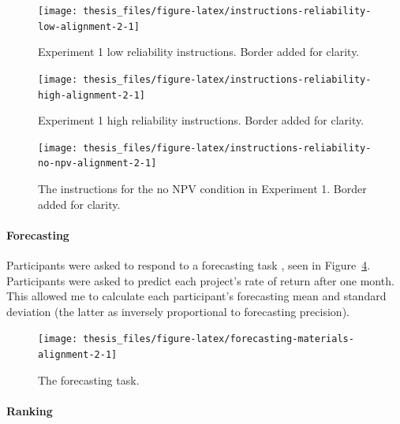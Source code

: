 \documentclass[a4paper, nobind, dvipsnames]{templates/ociamthesis}
\theoremstyle{definition}
\theoremstyle{definition}
\theoremstyle{definition}
\theoremstyle{definition}
\theoremstyle{remark}
\begin{document}
\begin{figure}
\texttt{[image: thesis\_files/figure-latex/instructions-reliability-low-alignment-2-1]} \caption{Experiment 1 low reliability instructions. Border added for clarity.}\label{fig:instructions-reliability-low-alignment-2}
\end{figure}



\begin{figure}
\texttt{[image: thesis\_files/figure-latex/instructions-reliability-high-alignment-2-1]} \caption{Experiment 1 high reliability instructions. Border added for clarity.}\label{fig:instructions-reliability-high-alignment-2}
\end{figure}



\begin{figure}
\texttt{[image: thesis\_files/figure-latex/instructions-reliability-no-npv-alignment-2-1]} \caption{The instructions for the no NPV condition in Experiment 1. Border added for clarity.}\label{fig:instructions-reliability-no-npv-alignment-2}
\end{figure}

\hypertarget{forecasting-materials-alignment-2}{%
\paragraph{Forecasting}\label{forecasting-materials-alignment-2}}

Participants were asked to respond to a forecasting task \autocite[adapted from][]{long2018}, seen in Figure~\ref{fig:forecasting-materials-alignment-2}.
Participants were asked to predict each project's rate of return after one
month. This allowed me to calculate each participant's forecasting mean and
standard deviation (the latter as inversely proportional to forecasting
precision).



\begin{figure}
\texttt{[image: thesis\_files/figure-latex/forecasting-materials-alignment-2-1]} \caption{The forecasting task.}\label{fig:forecasting-materials-alignment-2}
\end{figure}

\hypertarget{ranking-materials-alignment-2}{%
\paragraph{Ranking}\label{ranking-materials-alignment-2}}
\end{document}
